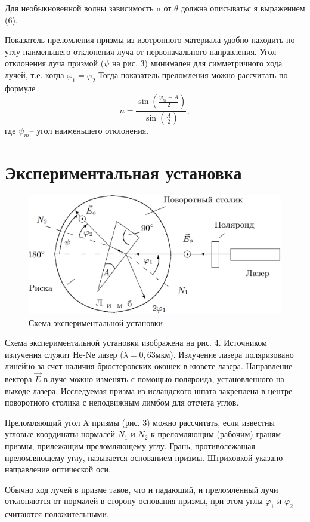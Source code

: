 \documentclass[journal, a4paper]{IEEEtran}
\begin{document}
Для необыкновенной волны зависимость
n от $\theta$ должна описыватьс
я выражением (6).

Показатель преломления призмы из изотропного материала
удобно
находить по углу наименьшего отклонения луча от первоначального направления. Угол отклонения луча призмой ($\psi$ на рис. 3) минимален для
симметричного
хода лучей, т.е.
когда
$\varphi_1=\varphi_2$ Тогда показатель преломления можно рассчитать по формуле
\begin{equation}
n=\frac{\sin{(\frac{\psi_m+A}{2})}}{\sin{(\frac{A}{2})}},
\end{equation}
где
$\psi_m$-- угол наименьшего отклонения.
\section{Экспериментальная установка}
\begin{figure}[h!]
\includegraphics[scale=0.26]{fig4}
\caption{Схема экспериментальной установки
}
\end{figure}
Схема экспериментальной
установки изображена на рис. 4. Источником излучения служит Не-Nе лазер
($\lambda
= 0,63 \text{мкм}$). Излучение лазера поляризовано линейно за счет наличия брюстеровских окошек в кювете лазера. Направление вектора
$\vec{E}$ в
луче можно изменять с помощью поляроида,
установленного на выходе
лазера. Исследуемая призма из исландского шпата закреплена в центре
поворотного столика с неподвижным лимбом для отсчета углов.

Преломляющий угол A призмы (рис. 3) можно рассчитать, если известны угловые
координаты нормалей
$N_1$ и
$N_2$ к преломляющим (рабочим) граням призмы, прилежащим преломляющему углу. Грань, противолежащая преломляющему углу, называется основанием призмы.
Штриховкой указано направление оптической оси.

Обычно
ход лучей в призме таков, что
и падающий,
и преломлённый
лучи отклоняются от нормалей в сторону основания призмы, при этом
углы
$\varphi_1$ и
$\varphi_2$ считаются положительными.
\end{document}
